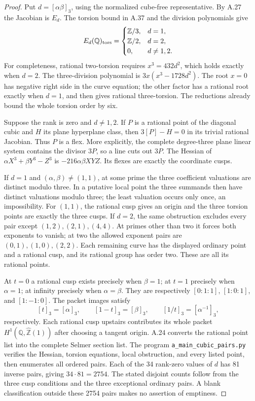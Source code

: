 \begin{proof}
Put $d=[\alpha\beta]_3$, using the normalized cube-free representative.
By A.27 the Jacobian is $E_d$. The torsion bound in A.37 and the division
polynomials give
\[
 E_d(\mathbb Q)_{\rm tors}=\begin{cases}
 \mathbb Z/3,&d=1,\\
 \mathbb Z/2,&d=2,\\
 0,&d\ne1,2.
 \end{cases}
\]
For completeness, rational two-torsion requires $x^3=432d^2$, which
holds exactly when $d=2$. The three-division polynomial is
$3x(x^3-1728d^2)$. The root $x=0$ has negative right side in the
curve equation; the other factor has a rational root exactly when $d=1$,
and then gives rational three-torsion. The reductions already bound the
whole torsion order by six.

Suppose the rank is zero and $d\ne1,2$. If $P$ is a rational point of
the diagonal cubic and $H$ its plane hyperplane class, then
$3[P]-H=0$ in its trivial rational Jacobian. Thus $P$ is a flex. More
explicitly, the complete degree-three plane linear system contains the
divisor $3P$, so a line cuts out $3P$. The Hessian of
$\alpha X^3+\beta Y^3-Z^3$ is
$-216\alpha\beta XYZ$. Its flexes are exactly the coordinate cusps.

If $d=1$ and $(\alpha,\beta)\ne(1,1)$, at some prime the three
coefficient valuations are distinct modulo three. In a putative local
point the three summands then have distinct valuations modulo three;
the least valuation occurs only once, an impossibility. For $(1,1)$,
the rational cusp gives an origin and the three torsion points are
exactly the three cusps. If $d=2$, the same obstruction excludes every
pair except $(1,2),(2,1),(4,4)$. At primes other than two it forces both
exponents to vanish; at two the allowed exponent pairs are
$(0,1),(1,0),(2,2)$. Each remaining curve has the displayed ordinary
point and a rational cusp, and its rational group has order two. These
are all its rational points.

At $t=0$ a rational cusp exists precisely when $\beta=1$; at $t=1$
precisely when $\alpha=1$; at infinity precisely when $\alpha=\beta$.
They are respectively $[0:1:1]$, $[1:0:1]$, and $[1:-1:0]$.
The packet images satisfy
\[
 [t]_3=[\alpha]_3,\qquad
 [1-t]_3=[\beta]_3,\qquad
 [1/t]_3=[\alpha^{-1}]_3,
\]
respectively. Each rational cusp upstairs contributes its whole packet
$H^1(\mathbb Q,\widehat{\mathbb Z}(1))$ after choosing a tangent origin.
A.24 converts the rational point list into the complete Selmer section
list. The program \texttt{a\_main\_cubic\_pairs.py} verifies the Hessian,
torsion equations, local obstruction, and every listed point, then
enumerates all ordered pairs. Each of the 34 rank-zero values of $d$
has 81 inverse pairs, giving $34\cdot81=2754$. The stated disjoint
counts follow from the three cusp conditions and the three exceptional
ordinary pairs. A blank classification outside these 2754 pairs makes
no assertion of emptiness.
\end{proof}

